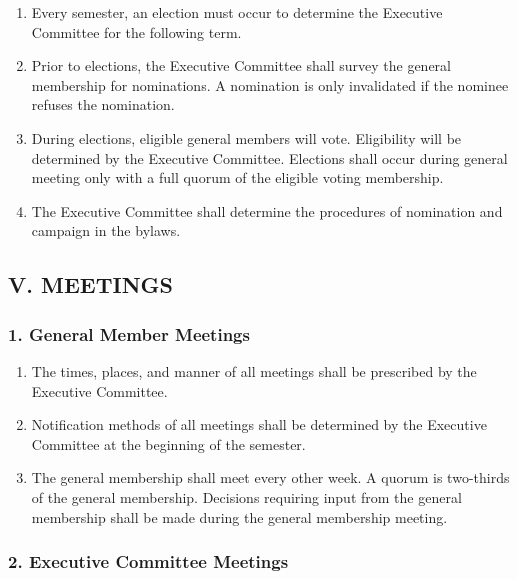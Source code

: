 \documentclass[
]{article}
\providecommand{\tightlist}{%
  \setlength{\itemsep}{0pt}\setlength{\parskip}{0pt}}
\begin{document}
\begin{enumerate}
\def\labelenumi{\arabic{enumi}.}
\tightlist
\item
  Every semester, an election must occur to determine the Executive
  Committee for the following term.
\item
  Prior to elections, the Executive Committee shall survey the general
  membership for nominations. A nomination is only invalidated if the
  nominee refuses the nomination.
\item
  During elections, eligible general members will vote. Eligibility will
  be determined by the Executive Committee. Elections shall occur during
  general meeting only with a full quorum of the eligible voting
  membership.
\item
  The Executive Committee shall determine the procedures of nomination
  and campaign in the bylaws.
\end{enumerate}

\hypertarget{v.-meetings}{%
\subsection{V. MEETINGS}\label{v.-meetings}}

\hypertarget{general-member-meetings}{%
\subsubsection{1. General Member
Meetings}\label{general-member-meetings}}

\begin{enumerate}
\def\labelenumi{\arabic{enumi}.}
\tightlist
\item
  The times, places, and manner of all meetings shall be prescribed by
  the Executive Committee.
\item
  Notification methods of all meetings shall be determined by the
  Executive Committee at the beginning of the semester.
\item
  The general membership shall meet every other week. A quorum is
  two-thirds of the general membership. Decisions requiring input from
  the general membership shall be made during the general membership
  meeting.
\end{enumerate}

\hypertarget{executive-committee-meetings}{%
\subsubsection{2. Executive Committee
Meetings}\label{executive-committee-meetings}}
\end{document}
